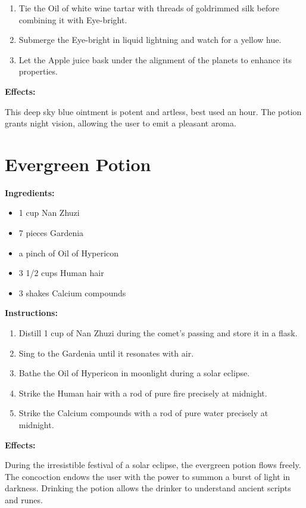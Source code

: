 \documentclass{article}
\begin{document}
\begin{enumerate}
  \item Tie the Oil of white wine tartar with threads of goldrimmed silk before combining it with Eye-bright.
  \item Submerge the Eye-bright in liquid lightning and watch for a yellow hue.
  \item Let the Apple juice bask under the alignment of the planets to enhance its properties.
\end{enumerate}

\textbf{Effects:}

This deep sky blue ointment is potent and artless, best used an hour. The potion grants night vision, allowing the user to emit a pleasant aroma.

\newpage
\section*{Evergreen Potion}

\textbf{Ingredients:}

\begin{itemize}
  \item 1 cup Nan Zhuzi
  \item 7 pieces Gardenia
  \item a pinch of Oil of Hypericon
  \item 3 1/2 cups Human hair
  \item 3 shakes Calcium compounds
\end{itemize}

\textbf{Instructions:}

\begin{enumerate}
  \item Distill 1 cup of Nan Zhuzi during the comet’s passing and store it in a flask.
  \item Sing to the Gardenia until it resonates with air.
  \item Bathe the Oil of Hypericon in moonlight during a solar eclipse.
  \item Strike the Human hair with a rod of pure fire precisely at midnight.
  \item Strike the Calcium compounds with a rod of pure water precisely at midnight.
\end{enumerate}

\textbf{Effects:}

During the irresistible festival of a solar eclipse, the evergreen potion flows freely. The concoction endows the user with the power to summon a burst of light in darkness. Drinking the potion allows the drinker to understand ancient scripts and runes.
\end{document}
